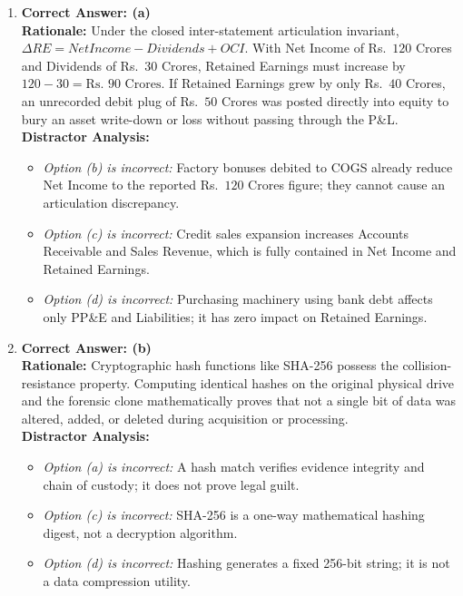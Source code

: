 \begin{enumerate}[label=\textbf{MCQ 4.\arabic*}]
    \item \textbf{Correct Answer: (a)}\\
    \textbf{Rationale:} Under the closed inter-statement articulation invariant, $\Delta RE = Net Income - Dividends + OCI$. With Net Income of Rs.~$120$ Crores and Dividends of Rs.~$30$ Crores, Retained Earnings must increase by $120 - 30 = \text{Rs.~} 90\text{ Crores}$. If Retained Earnings grew by only Rs.~$40$ Crores, an unrecorded debit plug of Rs.~$50$ Crores was posted directly into equity to bury an asset write-down or loss without passing through the P\&L.\\
    \textbf{Distractor Analysis:}
    \begin{itemize}
        \item \textit{Option (b) is incorrect:} Factory bonuses debited to COGS already reduce Net Income to the reported Rs.~$120$ Crores figure; they cannot cause an articulation discrepancy.
        \item \textit{Option (c) is incorrect:} Credit sales expansion increases Accounts Receivable and Sales Revenue, which is fully contained in Net Income and Retained Earnings.
        \item \textit{Option (d) is incorrect:} Purchasing machinery using bank debt affects only PP\&E and Liabilities; it has zero impact on Retained Earnings.
    \end{itemize}

    \item \textbf{Correct Answer: (b)}\\
    \textbf{Rationale:} Cryptographic hash functions like SHA-256 possess the collision-resistance property. Computing identical hashes on the original physical drive and the forensic clone mathematically proves that not a single bit of data was altered, added, or deleted during acquisition or processing.\\
    \textbf{Distractor Analysis:}
    \begin{itemize}
        \item \textit{Option (a) is incorrect:} A hash match verifies evidence integrity and chain of custody; it does not prove legal guilt.
        \item \textit{Option (c) is incorrect:} SHA-256 is a one-way mathematical hashing digest, not a decryption algorithm.
        \item \textit{Option (d) is incorrect:} Hashing generates a fixed 256-bit string; it is not a data compression utility.
    \end{itemize}
\end{enumerate}


